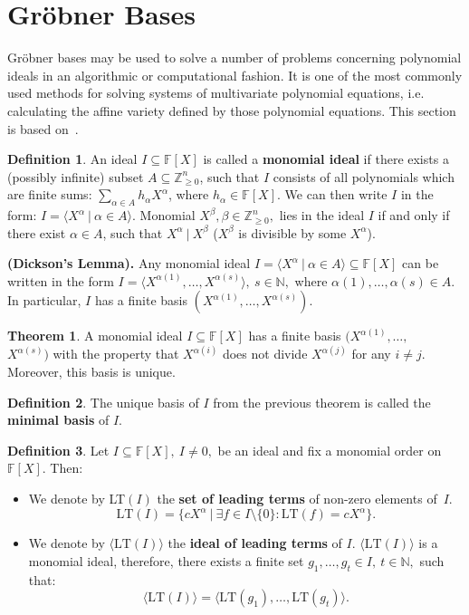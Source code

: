 \documentclass[thesis=M,english]{FITthesis}[2012/10/20]
\theoremstyle{remark}
\theoremstyle{definition}
\newtheorem{DF}{Definition}[section]
\newtheorem{theorem}{Theorem}[section]
\begin{document}
\section{Gröbner Bases}
Gröbner bases may be used to solve a number of problems concerning polynomial ideals in an algorithmic or computational fashion. It is one of the most commonly used methods for solving systems of multivariate polynomial equations, i.e. calculating the affine variety defined by those polynomial equations. This section is based on~\cite{algGeom}.
\begin{DF}
An ideal $I \subseteq \mathbb{F}[X]$ is called a \textbf{monomial ideal} if there exists a (possibly infinite) subset $A \subseteq \mathbb{Z}_{\geq 0}^n$, such that $I$ consists of all polynomials which are finite sums: $\sum_{\alpha \in A} h_\alpha X^\alpha$, where $h_\alpha \in \mathbb{F}[X].$ We can then write $I$ in the form: $I = \langle X^\alpha \ |\ \alpha \in A\rangle.$ Monomial $X^\beta, \beta \in \mathbb{Z}_{\geq 0}^n,$ lies in the ideal $I$ if and only if there exist $\alpha \in A$, such that $X^\alpha \ |\ X^\beta$ ($X^\beta$ is divisible by some $X^\alpha$). 
\end{DF}
\noindent \textbf{(Dickson's Lemma).} Any monomial ideal ${I = \langle X^\alpha \ |\ \alpha \in A\rangle \subseteq \mathbb{F}[X]}$ can be written in the form $I = \langle X^{\alpha(1)}, \ldots, X^{\alpha(s)}\rangle,\ s \in \mathbb{N},$ where $\alpha(1), \ldots, \alpha(s) \in A$. In particular, $I$ has a finite basis $(X^{\alpha(1)}, \ldots, X^{\alpha(s)})$.
\begin{theorem}
A monomial ideal $I \subseteq \mathbb{F}[X]$ has a finite basis $(X^{\alpha(1)}, \ldots, $\\$X^{\alpha(s)})$ with the property that $X^{\alpha(i)}$ does not divide $X^{\alpha(j)}$ for any $i \neq j$. Moreover, this basis is unique.
\end{theorem}
\begin{DF}
The unique basis of $I$ from the previous theorem is called the \textbf{minimal basis} of $I$.
\end{DF}
\begin{DF}
Let $I \subseteq \mathbb{F}[X],\ I \neq {0},$ be an ideal and fix a monomial order on $\mathbb{F}[X]$.  Then:
\begin{itemize}
\item We denote by LT$(I)$ the \textbf{set of leading terms} of non-zero elements of~$I$.
$$
\text{LT}(I) = \{ cX^\alpha \ |\ \exists f \in I \setminus \{0\}: \text{LT}(f)= cX^\alpha \}.
$$
\item We denote by $\langle \text{LT}(I) \rangle$ the \textbf{ideal of leading terms} of $I$. $\langle \text{LT}(I) \rangle$ is a monomial ideal, therefore, there exists a finite set $g_1,\ldots, g_t \in I,\ t \in \mathbb{N},$ such that:
$$
\langle \text{LT}(I) \rangle = \langle \text{LT}(g_1), \ldots, \text{LT}(g_t) \rangle.
$$
\end{itemize}
\end{DF}
\end{document}
